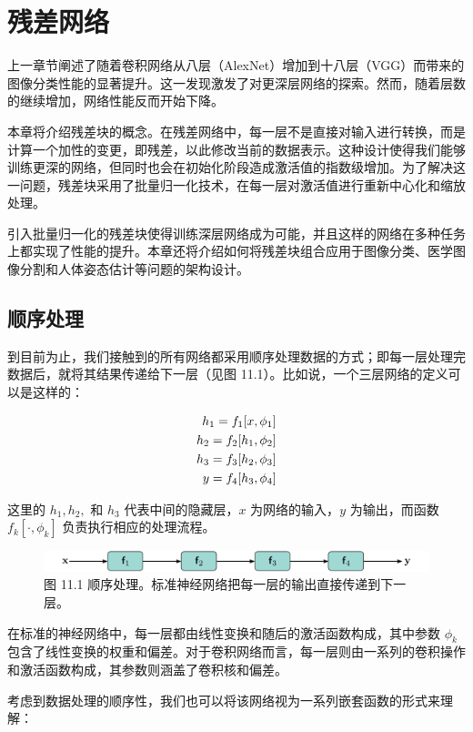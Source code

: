 \chapter{残差网络}

上一章节阐述了随着卷积网络从八层（AlexNet）增加到十八层（VGG）而带来的图像分类性能的显著提升。这一发现激发了对更深层网络的探索。然而，随着层数的继续增加，网络性能反而开始下降。

本章将介绍残差块的概念。在残差网络中，每一层不是直接对输入进行转换，而是计算一个加性的变更，即残差，以此修改当前的数据表示。这种设计使得我们能够训练更深的网络，但同时也会在初始化阶段造成激活值的指数级增加。为了解决这一问题，残差块采用了批量归一化技术，在每一层对激活值进行重新中心化和缩放处理。

引入批量归一化的残差块使得训练深层网络成为可能，并且这样的网络在多种任务上都实现了性能的提升。本章还将介绍如何将残差块组合应用于图像分类、医学图像分割和人体姿态估计等问题的架构设计。
\section{顺序处理}
到目前为止，我们接触到的所有网络都采用顺序处理数据的方式；即每一层处理完数据后，就将其结果传递给下一层（见图 11.1）。比如说，一个三层网络的定义可以是这样的：


\begin{align}
h_1 = f_1[x, \phi_1] \notag \\
h_2 = f_2[h_1, \phi_2] \notag \\
h_3 = f_3[h_2, \phi_3] \notag \\
y = f_4[h_3, \phi_4] 
\end{align} 


这里的 \(h_1, h_2,\) 和 \(h_3\) 代表中间的隐藏层，\(x\) 为网络的输入，\(y\) 为输出，而函数 \(f_k[\cdot, \phi_k]\) 负责执行相应的处理流程。

\begin{figure}[ht!]
\centering
\includegraphics[width=0.7\linewidth]{png/chapter11/ResidualSequential.png}
\caption{图 11.1 顺序处理。标准神经网络把每一层的输出直接传递到下一层。}
\end{figure}


在标准的神经网络中，每一层都由线性变换和随后的激活函数构成，其中参数 \(\phi_k\) 包含了线性变换的权重和偏差。对于卷积网络而言，每一层则由一系列的卷积操作和激活函数构成，其参数则涵盖了卷积核和偏差。

考虑到数据处理的顺序性，我们也可以将该网络视为一系列嵌套函数的形式来理解：

